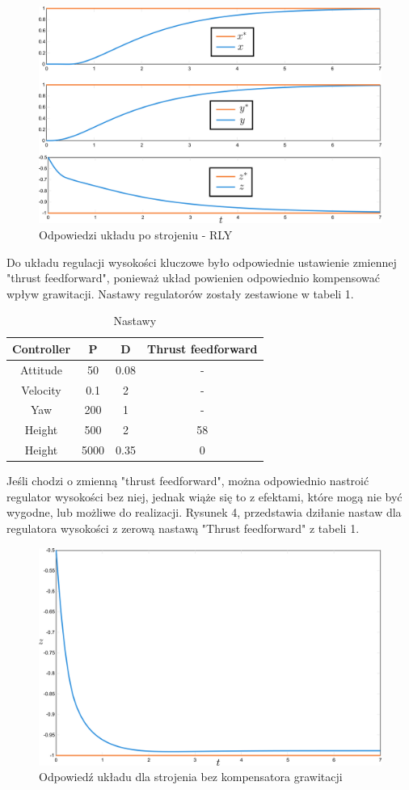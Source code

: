 \documentclass[polish,11pt,a4paper]{article}
\begin{document}
\begin{figure}[ht]
    \centering
    \includegraphics[width=0.7\linewidth]{strojenie/XYZ.png}
    \caption{Odpowiedzi układu po strojeniu - RLY}
    \label{fig:enter-label}
\end{figure}
Do układu regulacji wysokości kluczowe było odpowiednie ustawienie zmiennej "thrust feedforward", ponieważ 
układ powienien odpowiednio kompensować wpływ grawitacji. Nastawy regulatorów zostały zestawione w tabeli 1.
\begin{table}[h]
    \centering
    \caption{Nastawy}
    \label{tab:przyklad}
    \begin{tabular}{|c|c|c|c|}
        \hline
        Controller & P & D & Thrust feedforward \\ 
        \hline
        Attitude & 50 & 0.08 & - \\  
        \hline
        Velocity & 0.1 & 2 & - \\
        \hline 
        Yaw & 200 & 1 & - \\ 
        \hline
        Height & 500 & 2 & 58 \\  
        \hline
        Height & 5000 & 0.35 & 0 \\  
        \hline
    \end{tabular}
\end{table}

Jeśli chodzi o zmienną "thrust feedforward", można odpowiednio nastroić regulator wysokości bez niej, jednak wiąże się to z
efektami, które mogą nie być wygodne, lub możliwe do realizacji. Rysunek 4, przedstawia dziłanie nastaw dla regulatora
wysokości z zerową nastawą "Thrust feedforward" z tabeli 1.
\begin{figure}[ht]
    \centering
    \includegraphics[width=0.7\linewidth]{strojenie/z.png}
    \caption{Odpowiedź układu dla strojenia bez kompensatora grawitacji}
    \label{fig:enter-label}
\end{figure}
\end{document}
